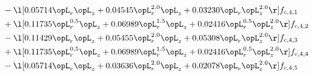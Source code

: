 \begin{alignat}{2}
& - \l[  0.05714 \opL_r \opL_z +  0.04545 \opL_r^{2.0} \opL_z +  0.03230 \opL_r \opL_z^{2.0}  \r] f_{c,4,1} \nonumber \\ 
& + \l[  0.11735 \opL_r^{0.5} \opL_z +  0.06989 \opL_r^{1.5} \opL_z +  0.02416 \opL_r^{0.5} \opL_z^{2.0}  \r] f_{c,4,2} \nonumber \\ 
& - \l[  0.11429 \opL_r \opL_z +  0.05455 \opL_r^{2.0} \opL_z +  0.05308 \opL_r \opL_z^{2.0}  \r] f_{c,4,3} \nonumber \\ 
& + \l[  0.11735 \opL_r^{0.5} \opL_z +  0.06989 \opL_r^{1.5} \opL_z +  0.02416 \opL_r^{0.5} \opL_z^{2.0}  \r] f_{c,4,4} \nonumber \\ 
& - \l[  0.05714 \opL_r \opL_z +  0.03636 \opL_r^{2.0} \opL_z +  0.02078 \opL_r \opL_z^{2.0}  \r] f_{c,4,5} \nonumber \\ 
\end{alignat} 


